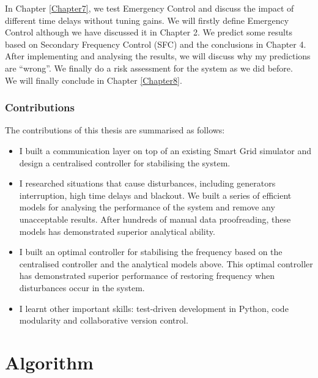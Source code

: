 \documentclass{report}
\begin{document}
In Chapter \textcolor{red}{\ref{Chapter7}}, we test Emergency Control and discuss the impact of different time delays without tuning gains. We will firstly define Emergency Control although we have discussed it in Chapter 2. We predict some results based on Secondary Frequency Control (SFC) and the conclusions in Chapter 4. After implementing and analysing the results, we will discuss why my predictions are “wrong”. We finally do a risk assessment for the system as we did before.\\

We will finally conclude in Chapter \textcolor{red}{\ref{Chapter8}}.\\

\section{Contributions} %
The contributions of this thesis are summarised as follows:\\
\begin{itemize}
  \item I built a communication layer on top of an existing Smart Grid simulator and design a centralised controller for stabilising the system.\\
  
  \item I researched situations that cause disturbances, including generators interruption, high time delays and blackout. We built a series of efficient models for analysing the performance of the system and remove any unacceptable results. After hundreds of manual data proofreading, these models has demonstrated superior analytical ability.\\
  
  \item I built an optimal controller for stabilising the frequency based on the centralised controller and the analytical models above. This optimal controller has demonstrated superior performance of restoring frequency when disturbances occur in the system.\\
  
  \item I learnt other important skills: test-driven development in Python, code modularity and collaborative version control.\\
\end{itemize}


\part{Algorithm}
\end{document}
